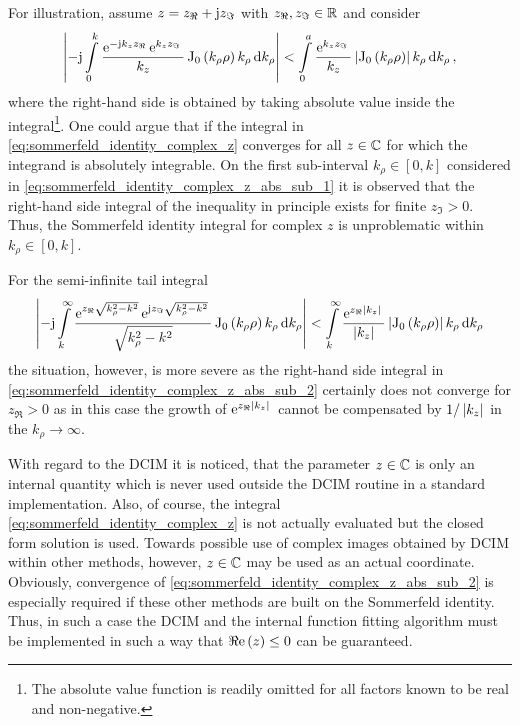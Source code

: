 For illustration, assume $z = z_\Re + \mathrm{j} z_\Im$ with $z_\Re, z_\Im \in \mathbb{R}$ and
consider
\begin{equation}\label{eq:sommerfeld_identity_complex_z_abs_sub_1}
	\left\vert
	-\mathrm{j}
	\int\limits_{0}^{k} 
	\frac{\mathrm{e}^{-\mathrm{j} k_z z_\Re}\, \mathrm{e}^{k_z z_\Im}\,}{k_z}
	\operatorname{J}_{0} \left(k_\rho \rho\right)
	k_\rho 
	\,
	\mathrm{d} k_\rho
	\right\vert
	<
	\int\limits_{0}^{a} 
	\frac{\mathrm{e}^{k_z z_\Im}\,}{k_z}
	\left\vert
	\operatorname{J}_{0} \left(k_\rho \rho\right)
	\right\vert
	k_\rho 
	\,
	\mathrm{d} k_\rho
	\, ,
\end{equation}
where the right-hand side is obtained by taking absolute value inside the
integral\footnote{The absolute value function is readily omitted for all factors
known to be real and non-negative.}.
One could argue that if the integral in
\eqref{eq:sommerfeld_identity_complex_z} converges for all $z \in \mathbb{C}$ for which
the integrand is absolutely integrable.
On the first sub-interval $k_\rho \in \left[0, k\right]$ considered in
\eqref{eq:sommerfeld_identity_complex_z_abs_sub_1} it is observed that 
the right-hand side integral of the inequality in principle exists
for finite $z_\Im > 0$.
Thus, the Sommerfeld identity integral for complex $z$ is unproblematic within
$k_\rho \in \left[0, k\right]$.

For the semi-infinite tail integral
\begin{equation}\label{eq:sommerfeld_identity_complex_z_abs_sub_2}
	\left\vert
	-\mathrm{j}
	\int\limits_{k}^{\infty} 
	\frac{
		\mathrm{e}^{z_\Re\sqrt{k_\rho^2 - k^2}}\,
		\mathrm{e}^{\mathrm{j} z_\Im \sqrt{k_\rho^2 - k^2}}\,
		}{\sqrt{k_\rho^2 - k^2}}
	\operatorname{J}_{0} \left(k_\rho \rho\right)
	k_\rho 
	\,
	\mathrm{d} k_\rho
	\right\vert
	<
	\int\limits_{k}^{\infty} 
	\frac{\mathrm{e}^{z_\Re \left\vert k_z\right\vert}\,}{\left\vert k_z\right\vert}
	\left\vert
	\operatorname{J}_{0} \left(k_\rho \rho\right)
	\right\vert
	k_\rho 
	\,
	\mathrm{d} k_\rho
\end{equation}
the situation, however, is more severe as the right-hand side integral in
\eqref{eq:sommerfeld_identity_complex_z_abs_sub_2} certainly does not converge
for $z_\Re > 0$ as in this case the growth of $\mathrm{e}^{z_\Re \left\vert k_z\right\vert}\,$ cannot be
compensated by $1 / \left\vert k_z\right\vert$ in the $k_\rho \to \infty$.

With regard to the \ac{DCIM} it is noticed, that the parameter $z \in \mathbb{C}$
is only an internal quantity which is never used outside the \ac{DCIM} routine
in a standard implementation.
Also, of course, the integral \eqref{eq:sommerfeld_identity_complex_z} is not
actually evaluated but the closed form solution is used.
Towards possible use of complex images obtained by \ac{DCIM} within other
methods, however, $z \in \mathbb{C}$ may be used as an actual coordinate.
Obviously, convergence of \eqref{eq:sommerfeld_identity_complex_z_abs_sub_2} is
especially required if these other methods are built on the Sommerfeld identity.
Thus, in such a case the \ac{DCIM} and the internal function fitting algorithm
must be implemented in such a way that $\Re\mathrm{e}\left(z\right) \leq 0$ can be guaranteed.








